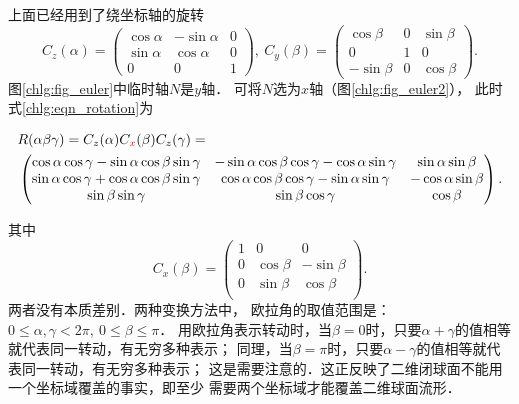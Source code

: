 上面已经用到了绕坐标轴的旋转
\begin{equation}\label{chlg:eqn_rotation-zy}
    {C_z}( \alpha  ) =  \begin{pmatrix}
        {\cos \alpha }&{ - \sin \alpha }&0 \\
        {\sin \alpha }&{\cos \alpha }&0 \\
        0&0&1
    \end{pmatrix} ,\
    {C_y}( \beta ) = \begin{pmatrix}
        {\cos \beta }&0&{  \sin \beta }  \\
        0&1&0\\
        { - \sin \beta } &0&{\cos \beta }
    \end{pmatrix}  .
\end{equation}
图\ref{chlg:fig_euler}中临时轴$N$是$y$轴．
可将$N$选为$x$轴（图\ref{chlg:fig_euler2}），
此时式\eqref{chlg:eqn_rotation}为
\begin{small}
\setlength{\mathindent}{0em}
\begin{equation}\label{chlg:eqn_rotation_euler_x}
    \begin{aligned}
        &R(\alpha\beta\gamma)=C_z(\alpha)C_{\color{red}{x}}(\beta)C_z(\gamma) =   \\
        &\begin{pmatrix}
            \cos\alpha \cos\gamma-\sin\alpha \cos\beta \sin\gamma  & -\sin\alpha \cos\beta \cos\gamma -\cos\alpha \sin\gamma &  \sin\alpha \sin\beta \\
            \sin\alpha \cos\gamma+\cos\alpha \cos\beta \sin\gamma  &  \cos\alpha \cos\beta \cos\gamma -\sin\alpha \sin\gamma & -\cos\alpha \sin\beta \\
            \sin\beta  \sin\gamma & \sin\beta \cos\gamma  & \cos\beta
        \end{pmatrix} .
    \end{aligned}
\end{equation}\setlength{\mathindent}{2em}
\end{small}
其中
\begin{equation}\label{chlg:eqn_rotation-x}
    {C_x}( \beta  ) = \begin{pmatrix}
        1&0&0 \\
        0&{\cos \beta }&{ - \sin \beta } \\
        0&{\sin \beta }&{\cos \beta } \\
    \end{pmatrix} .
\end{equation}
两者没有本质差别．两种变换方法中，
欧拉角的取值范围是：$0 \leqslant \alpha, \gamma < 2\pi,\ 0\leqslant \beta \leqslant \pi$．
用欧拉角表示转动时，当$\beta=0$时，只要$\alpha+\gamma$的值相等就代表同一转动，有无穷多种表示；
同理，当$\beta=\pi$时，只要$\alpha-\gamma$的值相等就代表同一转动，有无穷多种表示；
这是需要注意的．这正反映了二维闭球面不能用一个坐标域覆盖的事实，即至少
需要两个坐标域才能覆盖二维球面流形．


